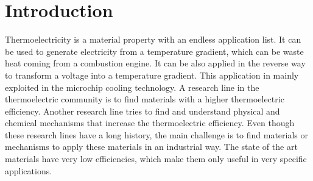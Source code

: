 
\chapter*{Introduction} %

\label{Chapter0} %


Thermoelectricity is a material property with an endless application list. It can be used to generate electricity 
from a temperature gradient, which can be waste heat coming from a combustion engine. It can be also applied in the 
reverse way to transform a voltage into a temperature gradient. This application in mainly exploited in the 
microchip cooling technology. A research line in the thermoelectric community is to find materials with a higher 
thermoelectric efficiency. Another research line tries to find and understand physical and chemical mechanisms that 
increase the thermoelectric efficiency. Even though these research lines have a long history, the main challenge is 
to find materials or mechanisms to apply these materials in an industrial way. The state of the art materials have 
very low efficiencies, which make them only useful in very specific applications. \\

